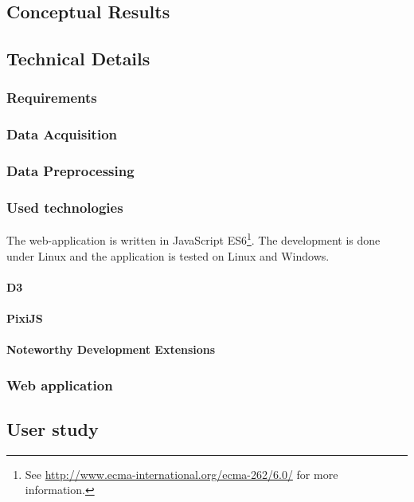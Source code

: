 \subsection{Conceptual Results}


\subsection{Technical Details}

\subsubsection{Requirements}


\subsubsection{Data Acquisition}
\label{s:data-acquisition}


\subsubsection{Data Preprocessing}
\label{s:data-preprocessing}


\subsubsection{Used technologies}
The web-application is written in JavaScript ES6\footnote{See \href{http://www.ecma-international.org/ecma-262/6.0/}{http://www.ecma-international.org/ecma-262/6.0/} for more information.}. The development is done under Linux and the application is tested on Linux and Windows.

\paragraph{D3}


\paragraph{PixiJS}


\paragraph{Noteworthy Development Extensions}


\subsubsection{Web application}
\label{s:web-application}


\subsection{User study}

